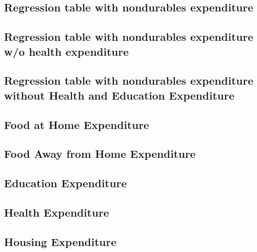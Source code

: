 \documentclass[a4paper,landscape]{article}
\begin{document}
\subsection{Regression table with nondurables expenditure}

\clearpage

\subsection{Regression table with nondurables expenditure w/o health expenditure} 

\clearpage

\subsection{Regression table with nondurables expenditure without Health and Education Expenditure}

\clearpage

\subsection{Food at Home Expenditure}

\clearpage

\subsection{Food Away from Home Expenditure}

\clearpage

\subsection{Education Expenditure}

\clearpage

\subsection{Health Expenditure}

\clearpage

\subsection{Housing Expenditure}

\clearpage
\end{document}
